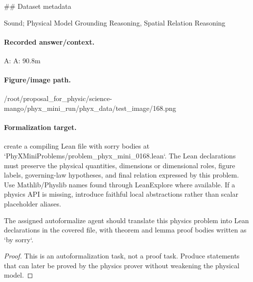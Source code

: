 \#\# Dataset metadata

Sound; Physical Model Grounding Reasoning, Spatial Relation Reasoning

\paragraph{Recorded answer/context.}
A: A: 90.8m

\paragraph{Figure/image path.}
/root/proposal\_for\_physic/science-mango/phyx\_mini\_run/phyx\_data/test\_image/168.png

\paragraph{Formalization target.}
create a compiling Lean file with sorry bodies at `PhyXMiniProblems/problem\_phyx\_mini\_0168.lean`. The Lean declarations must preserve the physical quantities, dimensions or dimensional roles, figure labels, governing-law hypotheses, and final relation expressed by this problem.
Use Mathlib/Physlib names found through LeanExplore where available. If a physics API is missing, introduce faithful local abstractions rather than scalar placeholder aliases.

\begin{theorem}
\label{thm:physics:phyx_mini_0168:target}
The assigned autoformalize agent should translate this physics problem into Lean declarations in the covered file, with theorem and lemma proof bodies written as `by sorry`.
\end{theorem}
\begin{proof}
This is an autoformalization task, not a proof task. Produce statements that can later be proved by the physics prover without weakening the physical model.
\end{proof}

